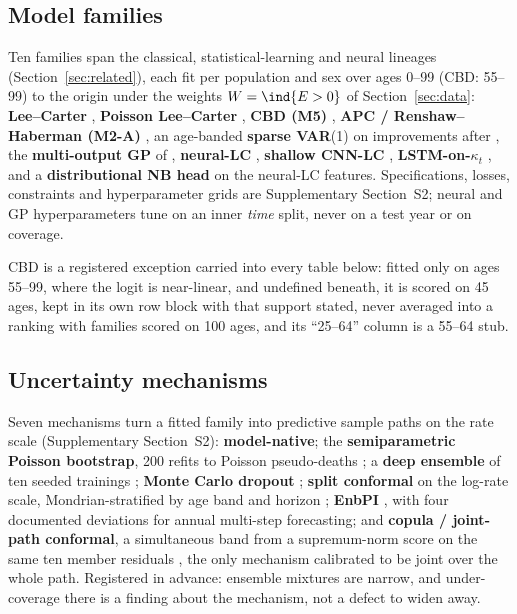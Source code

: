 \subsection{Model families}
\label{sec:design-families}

Ten families span the classical, statistical-learning and neural lineages
(Section~\ref{sec:related}), each fit per population and sex over ages 0--99
(CBD: 55--99) to the origin under the weights $W=\ind\{E>0\}$ of
Section~\ref{sec:data}: \textbf{Lee--Carter} \citep{lee1992modeling},
\textbf{Poisson Lee--Carter} \citep{brouhns2002poisson}, \textbf{CBD (M5)}
\citep{cairns2006two}, \textbf{APC / Renshaw--Haberman (M2-A)}
\citep{renshaw2006cohort}, an age-banded \textbf{sparse VAR}(1) on improvements
after \citet{li2017coherent}, the \textbf{multi-output GP} of
\citet{huynh2021multi}, \textbf{neural-LC} \citep{richman2021neural},
\textbf{shallow CNN-LC} \citep{perla2021time}, \textbf{LSTM-on-$\kappa_t$}
\citep{nigri2019deep}, and a \textbf{distributional NB head} on the neural-LC
features. Specifications, losses, constraints and hyperparameter grids are
Supplementary Section~S2; neural and GP hyperparameters tune on an inner
\emph{time} split, never on a test year or on coverage.

CBD is a registered exception carried into every table below: fitted only on
ages 55--99, where the logit is near-linear, and undefined beneath, it is scored
on 45 ages, kept in its own row block with that support stated, never averaged
into a ranking with families scored on 100 ages, and its ``25--64'' column is a
55--64 stub.

\subsection{Uncertainty mechanisms}
\label{sec:design-mechanisms}

Seven mechanisms turn a fitted family into predictive sample paths on the rate
scale (Supplementary Section~S2): \textbf{model-native}; the
\textbf{semiparametric Poisson bootstrap}, 200 refits to Poisson pseudo-deaths
\citep{brouhns2005bootstrapping}; a \textbf{deep ensemble} of ten seeded
trainings \citep{lakshminarayanan2017simple}; \textbf{Monte Carlo dropout}
\citep{gal2016dropout}; \textbf{split conformal} on the log-rate scale,
Mondrian-stratified by age band and horizon
\citep{lei2018distribution,vovk2005algorithmic}; \textbf{EnbPI}
\citep{xu2021conformal}, with four documented deviations for annual multi-step
forecasting; and \textbf{copula / joint-path conformal}, a simultaneous band
from a supremum-norm score on the same ten member residuals
\citep{diquigiovanni2022conformal,sun2024copula,messoudi2021copula}, the only
mechanism calibrated to be joint over the whole path. Registered in advance:
ensemble mixtures are narrow, and under-coverage there is a finding about the
mechanism, not a defect to widen away.

